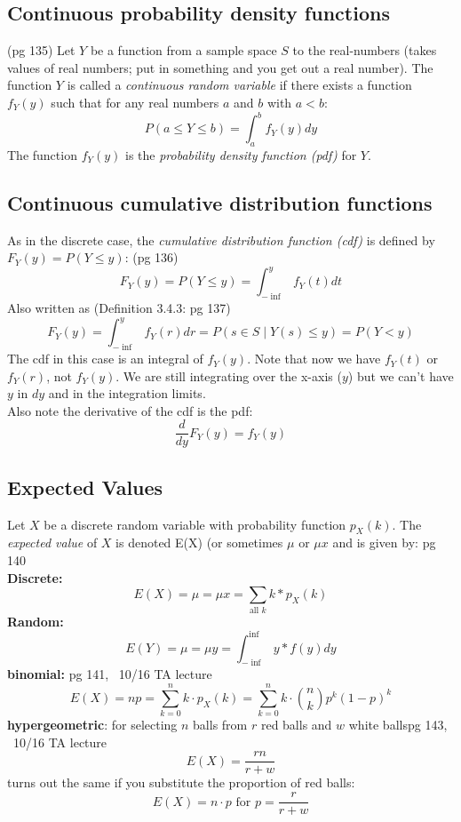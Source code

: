 \subsection{Continuous probability density functions}
{\tiny (pg 135)} Let $Y$ be a function from a sample space $S$ to the real-numbers (takes values of real numbers; put in something and you get out a real number).  The function $Y$ is called a \textit{continuous random variable} if there exists a function $f_Y(y)$ such that for any real numbers $a$ and $b$ with $a < b$:
	\[  P(a \leq Y \leq b) = \int_{a}^{b} f_Y(y)dy \]
The function $f_Y(y)$ is the \textit{probability density function (pdf)} for $Y$.  

\subsection{Continuous cumulative distribution functions}
As in the discrete case, the \textit{cumulative distribution function (cdf)} is defined by $F_Y(y) = P(Y \leq y)$: {\tiny (pg 136)}
	\[  F_Y(y) = P(Y \leq y) = \int_{- \inf}^{y} f_Y(t)dt \]
Also written as  {\tiny (Definition 3.4.3: pg 137)}
	\[  F_Y(y) = \int_{- \inf}^{y} f_Y(r)dr = P({s \in S \mid Y(s) \leq y}) = P(Y < y) \]
The cdf in this case is an integral of $f_Y(y)$.  Note that now we have $f_Y(t)$ or $f_Y(r)$, not $f_Y(y)$.  We are still integrating over the x-axis ($y$) but we can't have $y$ in $dy$ and in the integration limits.   \hfill \\  
Also note the derivative of the cdf is the pdf:
	\[  \frac{d}{dy}F_Y(y) = f_Y(y) \]
	
\subsection{Expected Values}
Let $X$ be a discrete random variable with probability function $p_X(k)$.  The \textit{expected value} of $X$ is denoted E(X) (or sometimes $\mu$ or $\mu x$ and is given by: {\tiny pg 140}   \hfill \\  
\textbf{Discrete:}
	\[  E(X) = \mu = \mu x = \sum\limits_{\mbox{all } k} k*p_X(k)  \]
\textbf{Random:}	  \hfill \\  
	\[  E(Y) = \mu = \mu y = \int_{- \inf}^{\inf} y*f(y)dy  \]
\textbf{binomial:} {\tiny pg 141, ~10/16 TA lecture} 	  \hfill \\
	\[ E(X) = np =  \sum\limits_{k=0}^{n} k \cdot p_X(k) = \sum\limits_{k=0}^{n}k \cdot {{n}\choose{k}}p^k(1-p)^k \]  
\textbf{hypergeometric}: for selecting $n$ balls from $r$ red balls and $w$ white balls{\tiny pg 143, ~10/16 TA lecture}  \hfill \\  
	\[ E(X) = \frac{rn}{r+w} \]
turns out the same if you substitute the proportion of red balls:
	\[ E(X) = n \cdot p \mbox{ for } p= \frac{r}{r+w} \]
\hfill \\  	

